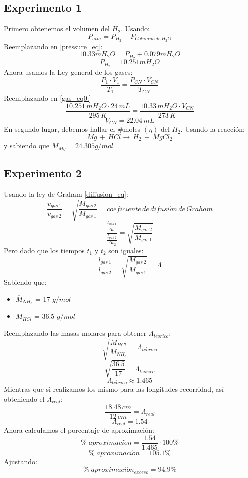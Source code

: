 \documentclass[../main.tex]{subfiles}
\begin{document}
\subsection{Experimento 1}
Primero obtenemos el volumen del $H_2$.
Usando:
\begin{equation} \label{pressure_eq}
    P_{atm} = P_{H_2} + P_{Columna \, de \, H_2O}
\end{equation}
Reemplazando en \ref{pressure_eq}:
\[ 10.33mH_2O = P_{H_2} + 0.079mH_2O \]
\[ P_{H_2} = 10.251mH_2O \]
Ahora usamos la Ley general de los gases:
\begin{equation} \label{gas_eq}
    \frac{P_1 \cdot V_1}{T_1} = \frac{P_{CN} \cdot V_{CN}}{T_{CN}}
\end{equation}
Reemplazando en \ref{gas_eq0:}
\[
    \frac{10.251 \, mH_2O \cdot 24 \, mL}{295 \, K} =
    \frac{10.33 \, mH_2O \cdot V_{CN}}{273 \, K}
\]
\[ V_{CN} = 22.04 \, mL\]
En segundo lugar, debemos hallar el #moles $(\eta)$ del $H_2$.
Usando la reacción:
\[ Mg \, + \, HCl \rightarrow \, H_2 \, + \, MgCl_2 \]
y sabiendo que $M_{Mg} = 24.305 g/mol$

\subsection{Experimento 2}

Usando la ley de Graham \ref{diffusion_eq}:
\begin{equation}
    \frac{v_{gas\, 1}}{v_{gas\, 2}} =
    \sqrt{\frac{M_{gas\, 2}}{M_{gas\, 1}}} =
    coeficiente \, de \, difusi\acute{o}n \, de \, Graham
\end{equation}
\[
    \frac{\frac{l_{gas\, 1}}{\Delta t_1}}{\frac{l_{gas\, 2}}{\Delta t_2}} =
    \sqrt{\frac{M_{gas\, 2}}{M_{gas\, 1}}} 
\]
Pero dado que los tiempos $t_1$ y $t_2$ son iguales:
\[
    \frac{l_{gas\, 1}}{l_{gas\, 2}} =
    \sqrt{\frac{M_{gas\, 2}}{M_{gas\, 1}}} =
    \Lambda
\]
Sabiendo que:
\begin{itemize}
    \item $\overline{M}_{NH_3}$ = 17 $g/mol$
    \item $\overline{M}_{HCl}$  = 36.5 $g/mol$
\end{itemize}
Reemplazando las masas molares para obtener $\Lambda_{te\acute{o}rico}$:
\[
    \sqrt{\frac{M_{HCl}}{M_{NH_3}}} =
    \Lambda_{te\acute{o}rico}
\]
\[
    \sqrt{\frac{36.5}{17}} =
    \Lambda_{te\acute{o}rico}
\]
\[ \Lambda_{te\acute{o}rico} \approx 1.465 \]
Mientras que si realizamos los mismo para las longitudes recorridad, así 
obteniendo el $\Lambda_{real}$:
\[
    \frac{18.48 \, cm}{12 \, cm} =
    \Lambda_{real}
\]
\[ \Lambda_{real} = 1.54\]
Ahora calculamos el porcentaje de aproximación:
\[ \% \; aproximaci\acute{o}n = \frac{1.54}{1.465} \cdot 100\%\]    
\[ \% \; aproximaci\acute{o}n = 105.1\%\]
Ajustando:
\[ \% \; aproximaci\acute{o}n_{exceso} = 94.9\%\]
\end{document}
